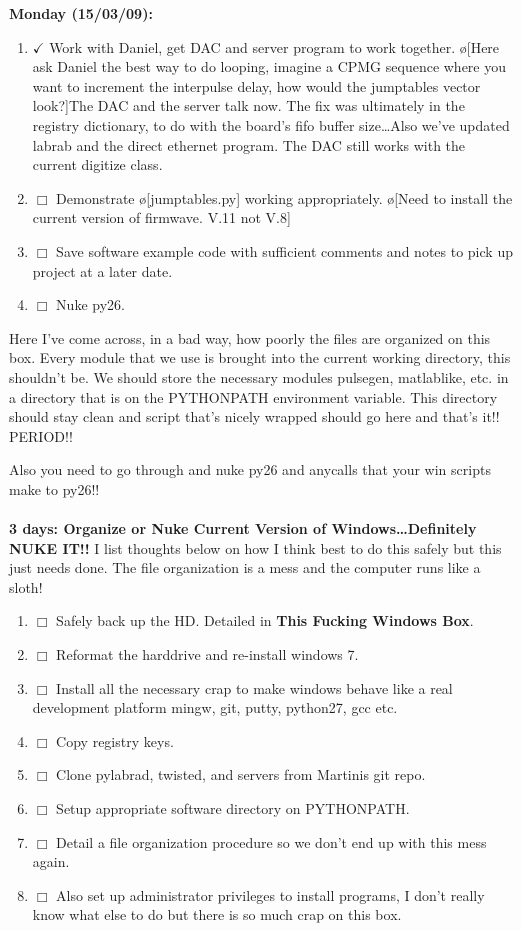 \documentclass[10pt]{book}
\begin{document}
{\bf Monday (15/03/09):}
\begin{enumerate}
    \item $\checkmark$ Work with Daniel, get DAC and server program to work together. \o[Here ask Daniel the best way to do looping, imagine a CPMG sequence where you want to increment the interpulse delay, how would the jumptables vector look?]{The DAC and the server talk now. The fix was ultimately in the registry dictionary, to do with the board's fifo buffer size\ldots Also we've updated labrab and the direct ethernet program. The DAC still works with the current digitize class.} 
    \item $\Box$ Demonstrate \o[jumptables.py]{} working appropriately. \o[Need to install the current version of firmwave. V.11 not V.8]{}
    \item $\Box$ Save software example code with sufficient comments and notes to pick up project at a later date. \\
    \item $\Box$ Nuke py26.
\end{enumerate} 
Here I've come across, in a bad way, how poorly the files are organized on this box. Every module that we use is brought into the current working directory, this shouldn't be. We should store the necessary modules pulsegen, matlablike, etc. in a directory that is on the PYTHONPATH environment variable. This directory should stay clean and script that's nicely wrapped should go here and that's it!! PERIOD!!

Also you need to go through and nuke py26 and anycalls that your win scripts make to py26!! \\ \\

{\bf 3 days: Organize or Nuke Current Version of Windows\ldots Definitely NUKE IT!!}
I list thoughts below on how I think best to do this safely but this just needs done. The file organization is a mess and the computer runs like a sloth!
\begin{enumerate}
    \item $\Box$ Safely back up the HD. Detailed in {\bf This Fucking Windows Box}.
    \item $\Box$ Reformat the harddrive and re-install windows 7.
    \item $\Box$ Install all the necessary crap to make windows behave like a real development platform mingw, git, putty, python27, gcc etc.
    \item $\Box$ Copy registry keys.
    \item $\Box$ Clone pylabrad, twisted, and servers from Martinis git repo.
    \item $\Box$ Setup appropriate software directory on PYTHONPATH.
    \item $\Box$ Detail a file organization procedure so we don't end up with this mess again.
    \item $\Box$ Also set up administrator privileges to install programs, I don't really know what else to do but there is so much crap on this box.\\
\end{enumerate}
\end{document}
